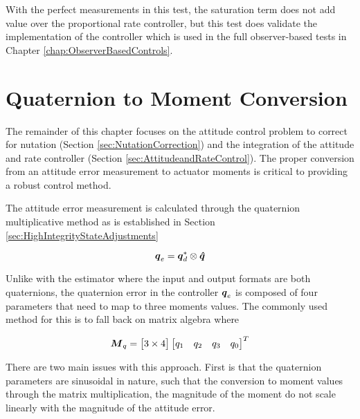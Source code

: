 With the perfect measurements in this test, the saturation term does not add value over the proportional rate controller, but this test does validate the implementation of the controller which is used in the full observer-based tests in Chapter \ref{chap:ObserverBasedControls}.













\section{Quaternion to Moment Conversion}

The remainder of this chapter focuses on the attitude control problem to correct for nutation (Section \ref{sec:NutationCorrection}) and the integration of the attitude and rate controller (Section \ref{sec:AttitudeandRateControl}).  The proper conversion from an attitude error measurement to actuator moments is critical to providing a robust control method.

The attitude error measurement is calculated through the quaternion multiplicative method as is established in Section \ref{sec:HighIntegrityStateAdjustments}

\begin{equation}
  \boldsymbol{q}_e = \boldsymbol{q}_d^* \otimes \boldsymbol{\hat{q}}
\end{equation}

Unlike with the estimator where the input and output formats are both quaternions, the quaternion error in the controller $\boldsymbol{q}_e$ is composed of four parameters that need to map to three moments values.  The commonly used method for this is to fall back on matrix algebra where

\begin{equation}
  \boldsymbol{M}_q = \begin{bmatrix} 3 \times 4 \end{bmatrix} \begin{bmatrix} q_1 & q_2 & q_3 & q_0 \end{bmatrix}^T
\end{equation}

There are two main issues with this approach.  First is that the quaternion parameters are sinusoidal in nature, such that the conversion to moment values through the matrix multiplication, the magnitude of the moment do not scale linearly with the magnitude of the attitude error.

